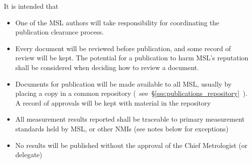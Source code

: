 It is intended that
\begin{itemize}
\item One of the MSL authors will take responsibility for coordinating the publication clearance process. 

\item  Every document will be reviewed before publication, and some record of review will be kept. The potential for a publication to harm MSL's reputation shall be considered when deciding how to review a document. 

\item  Documents for publication will be made available to all MSL, usually by placing a copy in a common repository (~see~\S\ref{sss:publications_repository}~). A record of approvals will be kept with material in the repository 



\item  All measurement results reported shall be traceable to primary measurement standards held by MSL, or other NMIs (see notes below for exceptions)
\item  No results will be published without the approval of the Chief Metrologist (or delegate) 
\end{itemize}

